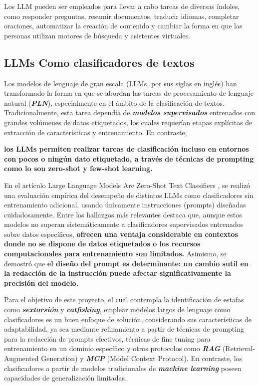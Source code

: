 Los LLM pueden ser empleados para llevar a cabo tareas de diversas índoles, como responder preguntas, resumir documentos, traducir idiomas, completar oraciones, automatizar la creación de contenido y cambiar la forma en que las personas utilizan motores de búsqueda y asistentes virtuales.

\subsection{LLMs Como clasificadores de textos}
Los modelos de lenguaje de gran escala (LLMs, por sus siglas en inglés) han transformado la forma en que se abordan las tareas de procesamiento de lenguaje natural (\textbf{\textit{PLN}}), especialmente en el ámbito de la clasificación de textos. Tradicionalmente, esta tarea dependía de \textbf{\textit{modelos supervisados}} entrenados con grandes volúmenes de datos etiquetados, los cuales requerían etapas explícitas de extracción de características y entrenamiento. En contraste,

\textbf{los LLMs permiten realizar tareas de clasificación incluso en entornos con pocos o ningún dato etiquetado, a través de técnicas de prompting como lo son zero-shot y few-shot learning.}

En el artículo Large Language Models Are Zero-Shot Text Classifiers \cite{wang2023largelanguagemodelszeroshot}, se realizó una evaluación empírica del desempeño de distintos LLMs como clasificadores sin entrenamiento adicional, usando únicamente instrucciones (prompts) diseñadas cuidadosamente. Entre los hallazgos más relevantes destaca que, aunque estos modelos no superan sistemáticamente a clasificadores supervisados entrenados sobre datos específicos, 
\textbf{ofrecen una ventaja considerable en contextos donde no se dispone de datos etiquetados o los recursos computacionales para entrenamiento son limitados.}
Asimismo, se demostró que \textbf{el diseño del prompt es determinante: un cambio sutil en la redacción de la instrucción puede afectar significativamente la precisión del modelo.}

Para el objetivo de este proyecto, el cual contempla la identificación de estafas como \textbf{\textit{sextorsión}} y \textbf{\textit{catfishing}}, emplear modelos largos de lenguaje como clasificadores es un buen enfoque de solución, considerando sus características de adaptabilidad, ya sea mediante refinamiento a partir de técnicas de prompting para la redacción de prompts efectivos, técnicas de fine tuning para entrenamiento en un dominio específico y otros protocolos como \textbf{\textit{RAG}} (Retrieval-Augmented Generation) y \textbf{\textit{MCP}} (Model Context Protocol). En contraste, los clasificadores a partir de modelos tradicionales de \textbf{\textit{machine learning}} poseen capacidades de generalización limitadas.

